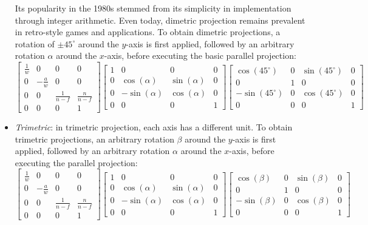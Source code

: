 \begin{itemize}
        Its popularity in the 1980s stemmed from its simplicity in implementation through integer arithmetic.
        Even today, dimetric projection remains prevalent in retro-style games and applications.
        To obtain dimetric projections, a rotation of $\pm 45^\circ$ around the $y$-axis is first applied, followed by an arbitrary rotation $\alpha$ around the $x$-axis, before executing the basic parallel projection:
        \[\begin{bmatrix}
            \frac{1}{w} & 0 & 0 & 0 \\ 
            0 & -\frac{a}{w} & 0 & 0 \\ 
            0 & 0 & \frac{1}{n-f} & \frac{n}{n-f} \\ 
            0 & 0 & 0 & 1 
        \end{bmatrix}\begin{bmatrix}
            1 & 0 & 0 & 0 \\ 
            0 & \cos(\alpha) & \sin(\alpha) & 0 \\ 
            0 & -\sin(\alpha) & \cos(\alpha) & 0 \\ 
            0 & 0 & 0 & 1 
        \end{bmatrix}\begin{bmatrix}
            \cos(45^\circ) & 0 & \sin(45^\circ) & 0 \\ 
            0 & 1 & 0 & 0 \\ 
            -\sin(45^\circ) & 0 & \cos(45^\circ) & 0 \\ 
            0 & 0 & 0 & 1 
        \end{bmatrix}\]
    \item \textit{Trimetric}: in trimetric projection, each axis has a different unit.
    To obtain trimetric projections, an arbitrary rotation $\beta$ around the $y$-axis is first applied, followed by an arbitrary rotation $\alpha$ around the $x$-axis, before executing the parallel projection:
        \[\begin{bmatrix}
            \frac{1}{w} & 0 & 0 & 0 \\ 
            0 & -\frac{a}{w} & 0 & 0 \\ 
            0 & 0 & \frac{1}{n-f} & \frac{n}{n-f} \\ 
            0 & 0 & 0 & 1 
        \end{bmatrix}\begin{bmatrix}
            1 & 0 & 0 & 0 \\ 
            0 & \cos(\alpha) & \sin(\alpha) & 0 \\ 
            0 & -\sin(\alpha) & \cos(\alpha) & 0 \\ 
            0 & 0 & 0 & 1 
        \end{bmatrix}\begin{bmatrix}
            \cos(\beta) & 0 & \sin(\beta) & 0 \\ 
            0 & 1 & 0 & 0 \\ 
            -\sin(\beta) & 0 & \cos(\beta) & 0 \\ 
            0 & 0 & 0 & 1 
        \end{bmatrix}\]
\end{itemize}
